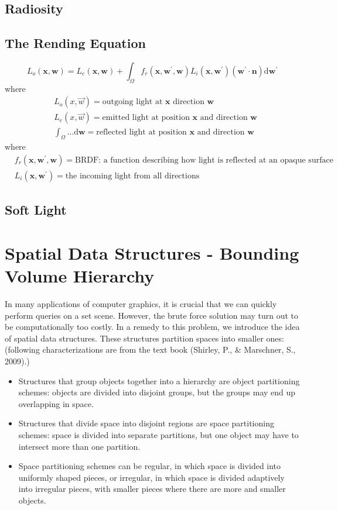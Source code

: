 \documentclass[11pt]{article}
\newcommand{\bn}{\mathbf{n}}
\newcommand{\bw}{\mathbf{w}}
\newcommand{\bx}{\mathbf{x}}
\begin{document}
\subsection{Radiosity}
\subsection{The Rending Equation}
\begin{equation}
	L_{o}(\bx, \bw)
	=
	L_{e}(\bx, \bw) 
	+
	\int_{\Omega} f_{r}\left(\bx, \bw^{\prime}, \bw\right) L_{i}\left(\bx, \bw^{\prime}\right)\left(\bw^{\prime} \cdot \bn\right) \mathrm{d} \bw^{\prime}
\end{equation}
where 
\begin{align}
	&L_{o}(x, \vec{w}) = \text{outgoing light at $\bx$ direction $\bw$} \\
	&L_{e}(x, \vec{w}) = \text{emitted light at position $\bx$ and direction $\bw$} \\
	&\int_\Omega \dots \mathrm d \bw = \text{reflected light at position $\bx$ and direction $\bw$}
\end{align}
where 
\begin{align}
	&f_{r}\left(\bx, \bw^{\prime}, \bw\right) 
	= \text{BRDF: a function describing how light is reflected at an opaque surface} \\
	&L_{i}\left(\bx, \bw^{\prime}\right) 
	= \text{the incoming light from all directions}
\end{align}
\subsection{Soft Light}

\section{Spatial Data Structures - Bounding Volume Hierarchy}
In many applications of computer graphics, it is crucial that we can quickly perform queries on a set scene. However, the brute force solution may turn out to be computationally too costly. In a remedy to this problem, we introduce the idea of spatial data structures. These structures partition spaces into smaller ones: (following characterizations are from the text book (Shirley, P., \& Marschner, S., 2009).)
\begin{itemize}
	\item Structures that group objects together into a hierarchy are object partitioning schemes: objects are divided into disjoint groups, but the groups may end up overlapping in space.
	\item Structures that divide space into disjoint regions are space partitioning schemes: space is divided into separate partitions, but one object may have to intersect more than one partition.
	\item Space partitioning schemes can be regular, in which space is divided into uniformly shaped pieces, or irregular, in which space is divided adaptively into irregular pieces, with smaller pieces where there are more and smaller objects.
\end{itemize}
\end{document}
